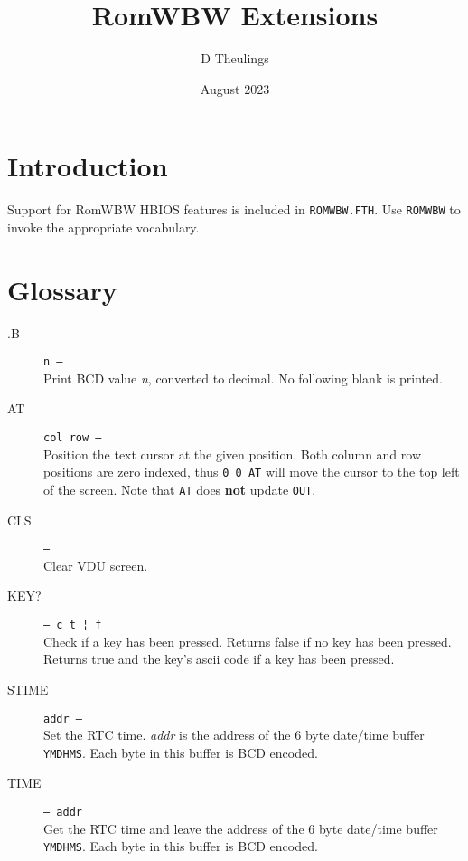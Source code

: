 \documentclass{article}
\title{RomWBW Extensions}
\author{D Theulings}
\date{August 2023}
\newcommand{\n}{\textit{n}}
\begin{document}
\maketitle
\begin{multicols}{2}[]
	\setlength{\parskip}{.5em}
	\setlength\parindent{0pt}

	\section{Introduction}
	Support for RomWBW HBIOS features\footnotemark{} is included in \verb|ROMWBW.FTH|.
	Use \verb|ROMWBW| to invoke the	appropriate vocabulary.

	\section{Glossary}
	\begin{description}
		\item[.B]\texttt{n --}\\
			Print BCD value \n{}, converted to decimal. No following blank is printed.

		\item[AT]\texttt{col row ---}\\
			Position the text cursor at the given position. Both column and
			row positions are zero indexed, thus \verb|0 0 AT| will move the
			cursor to the top left of the screen. Note that \verb|AT| does
			\textbf{not} update \verb|OUT|.

		\item[CLS]\texttt{---}\\
			Clear VDU screen.

		\item[KEY?]\texttt{--- c t ¦ f}\\
			Check if a key has been pressed. Returns false if no key has been
			pressed. Returns true and the key's ascii code if a key has been
			pressed.

		\item[STIME]\texttt{addr ---}\\
			Set the RTC time. \textit{addr} is the address of the 6 byte
			date/time buffer \verb|YMDHMS|. Each byte in this buffer is BCD
			encoded.

		\item[TIME]\texttt{--- addr}\\
			Get the RTC time and leave the address of the 6 byte date/time
			buffer \verb|YMDHMS|. Each byte in this buffer is BCD encoded.
	\end{description}

\end{multicols}
\end{document}
